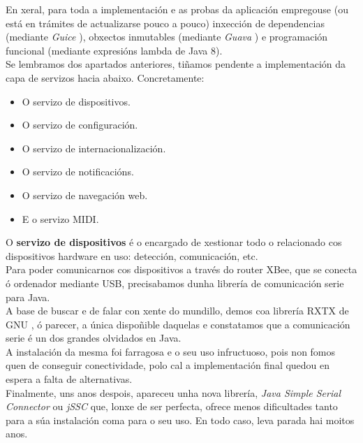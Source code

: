    En xeral, para toda a implementación e as probas da aplicación empregouse
   (ou está en trámites de actualizarse pouco a pouco) inxección de dependencias
   (mediante \textit{Guice} \cite{Guice}), obxectos inmutables (mediante
   \textit{Guava} \cite{Guava}) e programación funcional (mediante expresións
   lambda de Java 8). \\
   
   Se lembramos dos apartados anteriores, tiñamos pendente a implementación da
   capa de servizos hacia abaixo. Concretamente:
   
   \begin{itemize}
    \item O servizo de dispositivos.
    \item O servizo de configuración.
    \item O servizo de internacionalización.
    \item O servizo de notificacións.
    \item O servizo de navegación web.
    \item E o servizo MIDI.
   \end{itemize}
   
   O \textbf{servizo de dispositivos} é o encargado de xestionar todo o
   relacionado cos dispositivos hardware en uso: detección, comunicación,
   etc. \\
   
   Para poder comunicarnos cos dispositivos a través do router XBee, que se
   conecta ó ordenador mediante USB, precisabamos dunha librería de comunicación
   serie para Java. \\
   
   A base de buscar e de falar con xente do mundillo, demos coa librería RXTX de
   GNU \cite{RXTX}, ó parecer, a única dispoñible daquelas e constatamos que a
   comunicación serie é un dos grandes olvidados en Java. \\
   
   A instalación da mesma foi farragosa e o seu uso infructuoso, pois non fomos
   quen de conseguir conectividade, polo cal a implementación final quedou en
   espera a falta de alternativas. \\
   
   Finalmente, uns anos despois, apareceu unha nova librería,
   \textit{Java Simple Serial Connector} ou \textit{jSSC} \cite{jSSC} que, lonxe
   de ser perfecta, ofrece menos dificultades tanto para a súa instalación coma
   para o seu uso. En todo caso, leva parada hai moitos anos. \\
   
